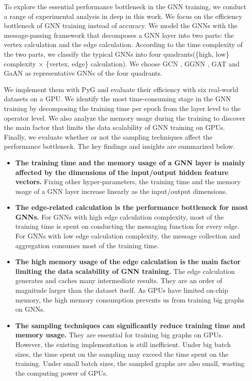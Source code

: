To explore the essential performance bottleneck in the GNN training, we conduct a range of experimental analysis in deep in this work. 
We focus on the efficiency bottleneck of GNN training instead of accuracy. 
We model the GNNs with the message-passing framework that decomposes a GNN layer into two parts: the vertex calculation and the edge calculation.  
According to the time complexity of the two parts, we classify the typical GNNs into four quadrants(\{high, low\} complexity $\times$ \{vertex, edge\} calculation).
We choose GCN \cite{kipf2017_gcn}, GGNN \cite{li2015_ggnn}, GAT \cite{huang2018_gat} and GaAN \cite{zhang2018_gaan} as representative GNNs of the four quadrants.

We implement them with PyG and evaluate their efficiency with six real-world datasets on a GPU.
We identify the most time-consuming stage in the GNN training by decomposing the training time per epoch from the layer level to the operator level.
We also analyze the memory usage during the training to discover the main factor that limits the data scalability of GNN training on GPUs. 
Finally, we evaluate whether or not the sampling techniques affect the performance bottleneck. 
The key findings and insights are summarized below.

\begin{itemize}
    \item \textbf{The training time and the memory usage of a GNN layer is mainly affected by the dimensions of the input/output hidden feature vectors.}
    Fixing other hyper-parameters, the training time and the memory usage of a GNN layer increase linearly as the input/output dimensions.
    \item \textbf{The edge-related calculation is the performance bottleneck for most GNNs.}
    For GNNs with high edge calculation complexity, most of the training time is spent on conducting the messaging function for every edge. 
    For GNNs with low edge calculation complexity, the message collection and aggregation consumes most of the training time.
    \item \textbf{The high memory usage of the edge calculation is the main factor limiting the data scalability of GNN training.}
    The edge calculation generates and caches many intermediate results. 
    They are an order of magnitude larger than the dataset itself. 
    As GPUs have limited on-chip memory, the high memory consumption prevents us from training big graphs on GNNs.
    \item \textbf{The sampling techniques can significantly reduce training time and memory usage.}
    They are essential for training big graphs on GPUs. 
    However, the existing implementation is still inefficient. 
    Under big batch sizes, the time spent on the sampling may exceed the time spent on the training. 
    Under small batch sizes, the sampled graphs are also small, wasting the computing power of GPUs.
\end{itemize}

